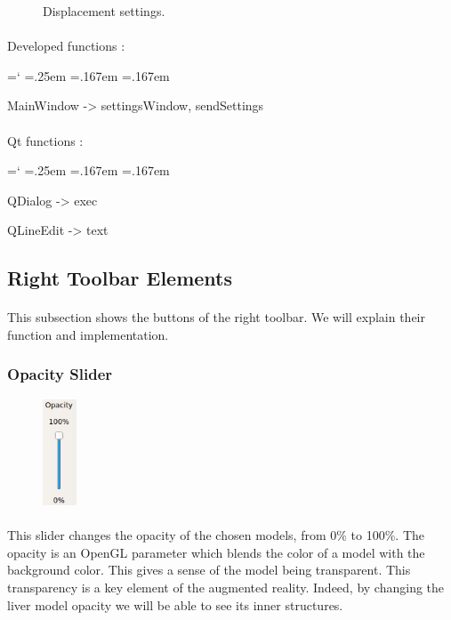 \documentclass[12pt]{report}
\DeclareRobustCommand*{\ttfamily}{
  \origttfamily
  \hyphenchar\font=`\-\relax
  \fontdimen3\font=.25em\relax
  \fontdimen4\font=.167em\relax
  \fontdimen7\font=.167em\relax
}
\newenvironment{code}{\ttfamily}{}
\begin{document}
\begin{figure}[H]
\caption{Displacement settings.}
\label{settings_003}
\endminipage
\end{figure}

\paragraph{}
	Developed functions :

	\begin{code}
	MainWindow -> settingsWindow, sendSettings
	\end{code}

\paragraph{}
	Qt functions :

	\begin{code}
	QDialog -> exec

	QLineEdit -> text
	\end{code}



\subsection{Right Toolbar Elements} \label{subsec:righy toolbar}
\paragraph{}
This subsection shows the buttons of the right toolbar. We will explain their function and implementation.

\subsubsection{Opacity Slider}

\begin{figure}
\vspace{-25pt}
\includegraphics[width=1cm]{img/opacitySlider.png}
\end{figure}
\paragraph{}
	This slider changes the opacity of the chosen models, from 0\% to 100\%. The opacity is an OpenGL parameter which blends the color of a model with the background color. This gives a sense of the model being transparent. This transparency is a key element of the augmented reality. Indeed, by changing the liver model opacity we will be able to see its inner structures.
\end{document}
